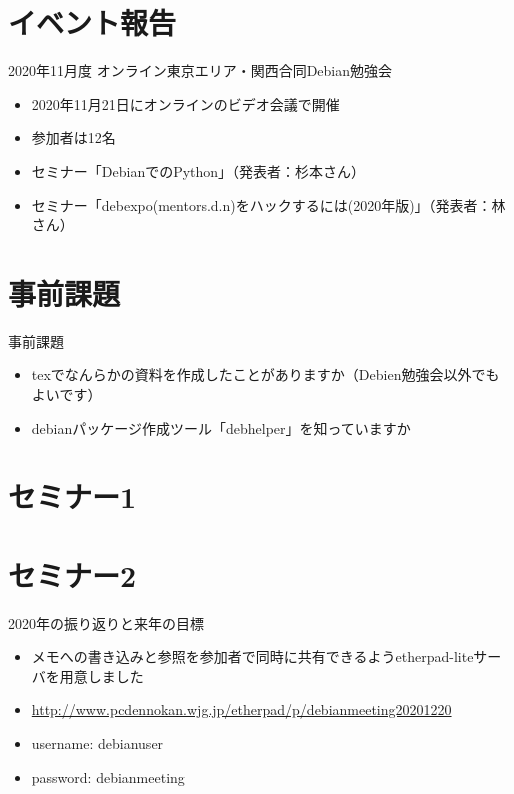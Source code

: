 \section{イベント報告}

\begin{frame}{2020年11月度 オンライン東京エリア・関西合同Debian勉強会}
\begin{itemize}
\item 2020年11月21日にオンラインのビデオ会議で開催
\item 参加者は12名
\item セミナー「DebianでのPython」（発表者：杉本さん）
\item セミナー「debexpo(mentors.d.n)をハックするには(2020年版)」（発表者：林さん）
\end{itemize}
\end{frame}


\section{事前課題}


\begin{frame}{事前課題}
  \begin{itemize}
  \item texでなんらかの資料を作成したことがありますか（Debien勉強会以外でもよいです）
  \item debianパッケージ作成ツール「debhelper」を知っていますか
  \end{itemize}
\end{frame}

{\footnotesize
 
}

%

\section{セミナー1}

\section{セミナー2}

\begin{frame}{2020年の振り返りと来年の目標}
\begin{itemize}
\item メモへの書き込みと参照を参加者で同時に共有できるようetherpad-liteサーバを用意しました
\item \url{http://www.pcdennokan.wjg.jp/etherpad/p/debianmeeting20201220}
\item username: debianuser
\item password: debianmeeting
\end{itemize}
\end{frame}


